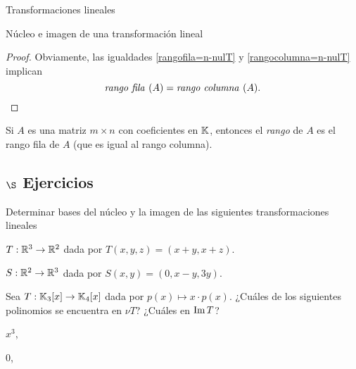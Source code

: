 \begin{chapter}{Transformaciones lineales}
\begin{section}{N\'ucleo e imagen de una transformaci\'on lineal}
\begin{proof}
            Obviamente, las igualdades \eqref{rangofila=n-nulT} y \eqref{rangocolumna=n-nulT} implican 
            $$
        \text{\textit{rango fila }} (A) = \text{\textit{rango  columna }} (A).
        $$
        \end{proof}
    
        \begin{definicion}
                Si $A$ es una matriz $m \times n$ con coeficientes  en $\mathbb K$,  entonces el \textit{rango} de $A$ es el rango fila de $A$ (que es igual al rango columna).
        \end{definicion}
        
        \subsection*{$\S$ Ejercicios}
        \begin{enumex}
            \item Determinar bases del núcleo y la imagen de las siguientes transformaciones lineales
                \begin{enumex}
                    \item $T: \mathbb R^3 \to \mathbb R^2$ dada por $T(x,y,z) = (x+y, x+z)$.
                    \item $S: \mathbb R^2 \to \mathbb R^3$ dada por $S(x,y) = (0,x-y, 3y)$.
                \end{enumex}
            \item Sea $T: \mathbb K_3[x] \to \mathbb K_4[x]$ dada por $p(x) \mapsto x\cdot p(x)$. ¿Cuáles de los siguientes polinomios se encuentra en $\nu T$? ¿Cuáles en  $\operatorname{Im} T$?
                \begin{enumex}
                    \begin{minipage}{0.3\textwidth}
                        \item $x^3$,
                    \end{minipage}
                    \begin{minipage}{0.3\textwidth}
                        \item $0$, 
                    \end{minipage}


\end{enumex}
\end{enumex}
\end{section}
\end{chapter}
